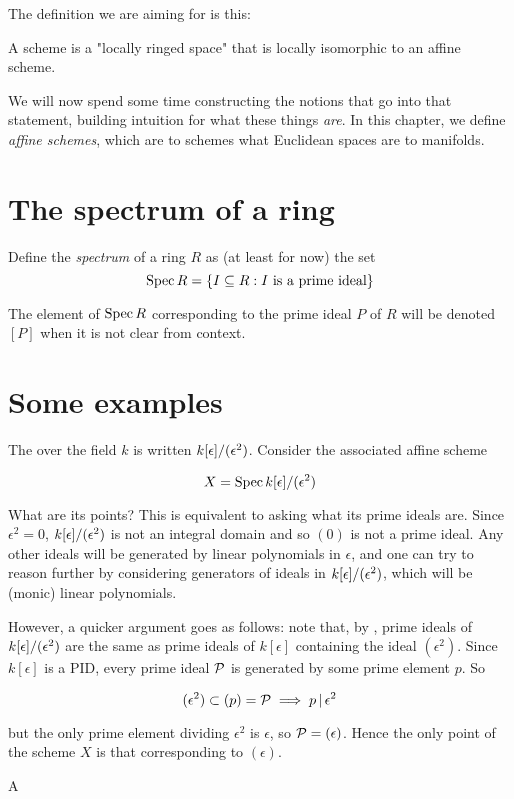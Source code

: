 \medskip\noindent The definition we are aiming for is this:

\begin{adefinition}[Target]
  A scheme is a "locally ringed space" that is locally isomorphic to an affine
  scheme.
\end{adefinition}

We will now spend some time constructing the notions that go into that
statement, building intuition for what these things \emph{are}. In this chapter,
we define \emph{affine schemes}, which are to schemes what Euclidean spaces are
to manifolds.

\section{The spectrum of a ring}%
\label{sec:the-spectrum-of-a-ring}

\begin{adefinition}[Provisional]
 Define the \emph{spectrum} of a ring $R$ as (at least for now) the set
\[ \operatorname{Spec} R = \{ I \subseteq R : I \text{ is a prime ideal} \} \]
\end{adefinition}

The element of $\operatorname{Spec} R$ corresponding to the prime ideal $P$ of $R$ will be
denoted $[P]$ when it is not clear from context.

\section{Some examples}
\label{sec:examples-of-affine-schemes}

\begin{example}
  The  over the field $k$ is written
  ${k}[\epsilon]/(\epsilon^2)$. Consider the associated affine scheme

  \[ X = \operatorname{Spec} {k}[\epsilon]/(\epsilon^2) \]

  \medskip\noindent What are its points? This is equivalent to asking what its
  prime ideals are. Since $\epsilon^2 = 0$, ${k}[\epsilon]/(\epsilon^2)$ is not an integral domain
  and so $(0)$ is not a prime ideal. Any other ideals will be generated by
  linear polynomials in $\epsilon$, and one can try to reason further by
  considering generators of ideals in ${k}[\epsilon]/(\epsilon^2)$, which will be (monic) linear
  polynomials.

  \medskip\noindent However, a quicker argument goes as follows: note that, by
  , prime ideals of ${k}[\epsilon]/(\epsilon^2)$
  are the same as prime ideals of $k[\epsilon]$ containing the ideal
  $(\epsilon^2)$. Since $k[\epsilon]$ is a PID, every prime ideal $\mathcal{P}$ is
  generated by some prime element $p$. So

  \[ (\epsilon^2) \subset (p) = \mathcal{P} \implies p \mathop{|} \epsilon^2 \]

  \medskip\noindent but the only prime element dividing $\epsilon^2$ is
  $\epsilon$, so $\mathcal{P} = (\epsilon)$. Hence the only point of the scheme $X$ is
  that corresponding to $(\epsilon)$.

  A

\end{example}
